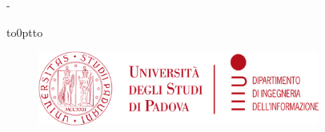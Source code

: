 \begin{titlingpage}
	\thispagestyle{empty}

	{
		\setlength\parindent{0pt}


		\calccentering\unitlength %

		\begin{adjustwidth}{\unitlength}{-\unitlength}
			\begin{center}
				\vbox to0pt{\vbox to\vss}
				\begin{figure}
					\centering
					\includegraphics[height=2.45cm]{themes/unipd-dei/static/unipd-dei.png}%
				\end{figure}


\end{center}
\end{adjustwidth}}
\end{titlingpage}
